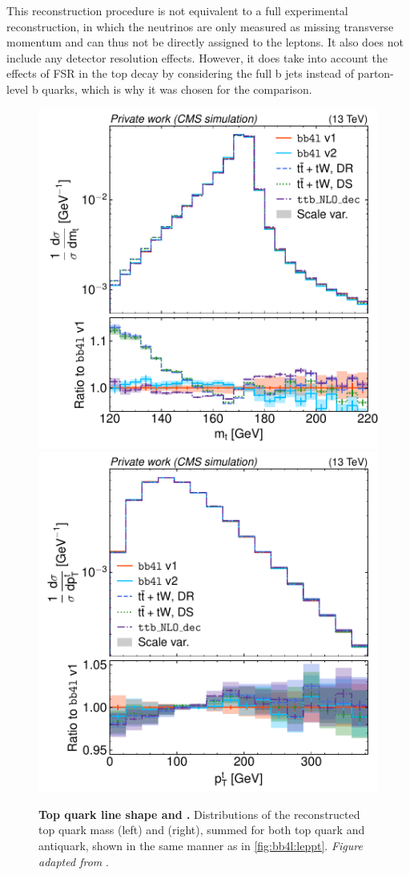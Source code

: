 This reconstruction procedure is not equivalent to a full experimental reconstruction, in which the neutrinos are only measured as missing transverse momentum and can thus not be directly assigned to the leptons. It also does not include any detector resolution effects. However, it does take into account the effects of FSR in the top decay by considering the full b jets instead of parton-level b quarks, which is why it was chosen for the comparison.

\begin{figure}[tp]
    \centering
    \includegraphics[width=0.49 \textwidth]{figures/bb4l/generators/MC_TTBAR_DILEP_SPINDENSITY_anytop_mass.pdf}
    \hfill
    \includegraphics[width=0.49 \textwidth]{figures/bb4l/generators/MC_TTBAR_DILEP_SPINDENSITY_anytop_pt.pdf}
    \caption{\textbf{Top quark line shape and \pt.} Distributions of the reconstructed top quark mass (left) and \pt (right), summed for both top quark and antiquark, shown in the same manner as in \cref{fig:bb4l:leppt}. \textit{Figure adapted from }.}
    \label{fig:bb4l:top}
\end{figure}

